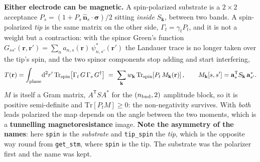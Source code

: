 \documentclass[11pt,a4paper]{article}
\newcommand{\code}[1]{\texttt{\small #1}}
\begin{document}
\textbf{Either electrode can be magnetic.} A spin-polarized substrate is a
$2\times2$ acceptance $P_s = (1 + P_s\,\hat{\mathbf n}_s\!\cdot\!\boldsymbol\sigma)/2$
sitting \emph{inside} $S_{\mathbf k}$, between two bands. A spin-polarized
\emph{tip} is the same matrix on the other side, $\Gamma_t = \gamma_t P_t$, and
it is not a weight but a contraction: with the spinor Green's function
$G_{ss'}(\mathbf r, \mathbf r') = \sum_n a_{n,s}(\mathbf r)\,
\psi^{*}_{n,s'}(\mathbf r')$ the Landauer trace is no longer taken over the
tip's spin, and the two spinor components stop adding and start interfering,
\begin{equation*}
  T(\mathbf r) = \int_{\rm plane}\!\mathrm{d}^2 r'\,
     \mathrm{Tr}_{\rm spin}\!\left[\Gamma_t\, G\, \Gamma_s\, G^\dagger\right]
  \;=\; \sum_{\mathbf k} w_{\mathbf k}\,
     \mathrm{Tr}_{\rm spin}\!\left[P_t\, M_{\mathbf k}(\mathbf r)\right],
  \qquad
  M_{\mathbf k}[s,s'] = \mathbf a_s^{\mathsf T} S_{\mathbf k}\, \mathbf a_{s'}^{*} .
\end{equation*}
$M$ is itself a Gram matrix, $A^{\mathsf T} S A^{*}$ for the $(n_{\rm bnd},2)$
amplitude block, so it is positive semi-definite and $\mathrm{Tr}[P_t M] \ge 0$:
the non-negativity survives. With \emph{both} leads polarized the map depends on
the angle between the two moments, which is a \textbf{tunnelling
magnetoresistance} image. \textbf{Note the asymmetry of the names}: here
\code{spin} is the \emph{substrate} and \code{tip\_spin} the \emph{tip}, which is
the opposite way round from \code{get\_stm}, where \code{spin} is the tip. The
substrate was the polarizer first and the name was kept.
\end{document}
